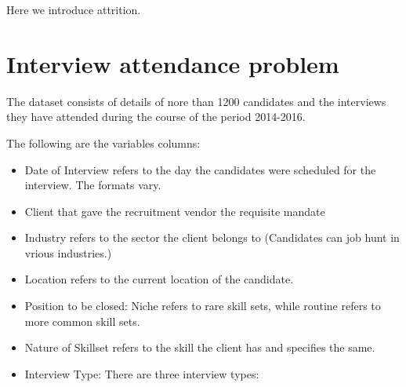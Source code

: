 \documentclass[12pt, krantz2,]{krantz}
\providecommand{\tightlist}{%
  \setlength{\itemsep}{0pt}\setlength{\parskip}{0pt}}
\begin{document}
Here we introduce attrition.

\hypertarget{interview-attendance}{%
\chapter{Interview attendance problem}\label{interview-attendance}}

The dataset consists of details of nore than 1200 candidates and the interviews they have attended during the course of the period 2014-2016.

The following are the variables columns:

\begin{itemize}
\tightlist
\item
  Date of Interview refers to the day the candidates were scheduled for the interview. The formats vary.
\item
  Client that gave the recruitment vendor the requisite mandate
\item
  Industry refers to the sector the client belongs to (Candidates can job hunt in vrious industries.)
\item
  Location refers to the current location of the candidate.
\item
  Position to be closed: Niche refers to rare skill sets, while routine refers to more common skill sets.
\item
  Nature of Skillset refers to the skill the client has and specifies the same.
\item
  Interview Type: There are three interview types:


\end{itemize}
\end{document}
